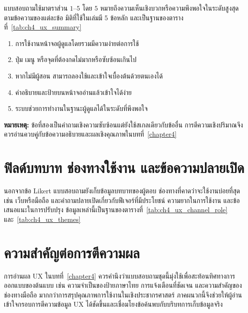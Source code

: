 แบบสอบถามใช้มาตราส่วน \(1\)--\(5\) โดย \(5\) หมายถึงความเห็นเชิงบวกหรือความพึงพอใจในระดับสูงสุดตามข้อความของแต่ละข้อ มิติที่ใช้ในเล่มมี 5 ข้อหลัก และเป็นฐานของตารางที่~\ref{tab:ch4_ux_summary}

\begin{enumerate}
    \item การใช้งานหน้าจอผู้ดูแลโดยรวมมีความง่ายต่อการใช้
    \item ปุ่ม เมนู หรือจุดที่ต้องกดไม่มากหรือซับซ้อนเกินไป
    \item หากไม่มีผู้สอน สามารถลองใช้และเข้าใจเบื้องต้นด้วยตนเองได้
    \item คำอธิบายและป้ายบนหน้าจออ่านแล้วเข้าใจได้ง่าย
    \item ระบบช่วยการทำงานในฐานะผู้ดูแลได้ในระดับที่พึงพอใจ
\end{enumerate}

\noindent\textbf{หมายเหตุ:} ข้อที่สองเป็นคำถามเชิงความซับซ้อนแต่ยังใช้สเกลเดียวกับข้ออื่น การตีความเชิงปริมาณจึงควรอ่านควบคู่กับข้อความอธิบายและผลเชิงคุณภาพในบทที่~\ref{chapter4}

\section*{ฟิลด์บทบาท ช่องทางใช้งาน และข้อความปลายเปิด}

นอกจากข้อ Likert แบบสอบถามยังเก็บข้อมูลบทบาทของผู้ตอบ ช่องทางที่คาดว่าจะใช้งานบ่อยที่สุด เช่น เว็บหรือมือถือ และคำถามปลายเปิดเกี่ยวกับฟีเจอร์ที่มีประโยชน์ ความยากในการใช้งาน และข้อเสนอแนะในการปรับปรุง ข้อมูลเหล่านี้เป็นฐานของตารางที่~\ref{tab:ch4_ux_channel_role} และ~\ref{tab:ch4_ux_themes}

\section*{ความสำคัญต่อการตีความผล}

การอ่านผล UX ในบทที่~\ref{chapter4} ควรคำนึงว่าแบบสอบถามชุดนี้มุ่งใช้เพื่อสะท้อนทิศทางการออกแบบของต้นแบบ เช่น ความจำเป็นของป้ายภาษาไทย การแจ้งเตือนที่ชัดเจน และความสำคัญของช่องทางมือถือ มากกว่าการสรุปคุณภาพการใช้งานในเชิงประชากรศาสตร์ ภาคผนวกนี้จึงช่วยให้ผู้อ่านเข้าใจกรอบการตีความข้อมูล UX ได้ชัดขึ้นและเชื่อมโยงข้อค้นพบกับบริบทการเก็บข้อมูลจริง
